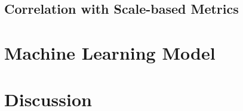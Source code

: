 \subsection{Correlation with Scale-based Metrics}
\label{subsec:smartCorrelation}
\section{Machine Learning Model}
\label{sec:smartMachineLearning}

\section{Discussion}
\label{sec:smartDiscussion}

